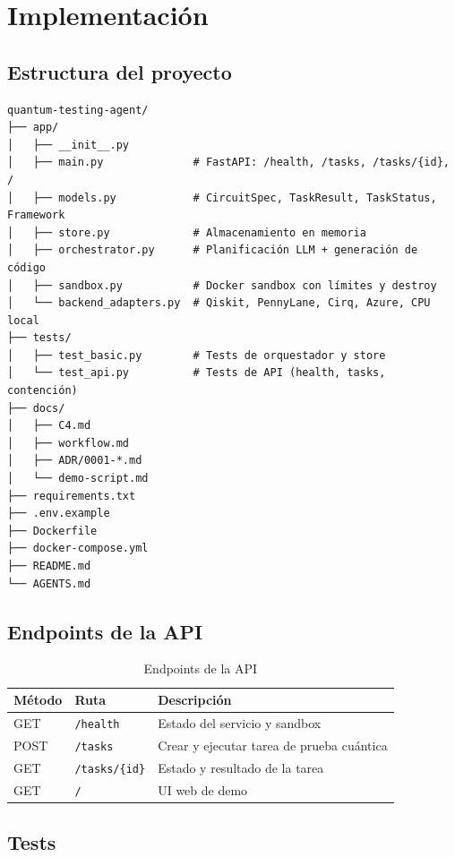 \documentclass[11pt,a4paper]{article}
\begin{document}
\section{Implementación}

\subsection{Estructura del proyecto}

\begin{verbatim}
quantum-testing-agent/
├── app/
│   ├── __init__.py
│   ├── main.py              # FastAPI: /health, /tasks, /tasks/{id}, /
│   ├── models.py            # CircuitSpec, TaskResult, TaskStatus, Framework
│   ├── store.py             # Almacenamiento en memoria
│   ├── orchestrator.py      # Planificación LLM + generación de código
│   ├── sandbox.py           # Docker sandbox con límites y destroy
│   └── backend_adapters.py  # Qiskit, PennyLane, Cirq, Azure, CPU local
├── tests/
│   ├── test_basic.py        # Tests de orquestador y store
│   └── test_api.py          # Tests de API (health, tasks, contención)
├── docs/
│   ├── C4.md
│   ├── workflow.md
│   ├── ADR/0001-*.md
│   └── demo-script.md
├── requirements.txt
├── .env.example
├── Dockerfile
├── docker-compose.yml
├── README.md
└── AGENTS.md
\end{verbatim}

\subsection{Endpoints de la API}

\begin{table}[h]
\centering
\begin{tabular}{lll}
\toprule
\textbf{Método} & \textbf{Ruta} & \textbf{Descripción} \\
\midrule
GET & \texttt{/health} & Estado del servicio y sandbox \\
POST & \texttt{/tasks} & Crear y ejecutar tarea de prueba cuántica \\
GET & \texttt{/tasks/\{id\}} & Estado y resultado de la tarea \\
GET & \texttt{/} & UI web de demo \\
\bottomrule
\end{tabular}
\caption{Endpoints de la API}
\end{table}

\subsection{Tests}
\end{document}
